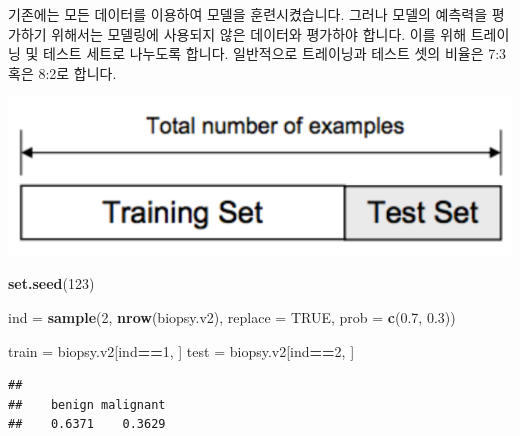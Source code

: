 \documentclass[12pt,]{book}
\newenvironment{Shaded}{\begin{snugshade}}{\end{snugshade}}
\newcommand{\DataTypeTok}[1]{\textcolor[rgb]{0.13,0.29,0.53}{#1}}
\newcommand{\DecValTok}[1]{\textcolor[rgb]{0.00,0.00,0.81}{#1}}
\newcommand{\FloatTok}[1]{\textcolor[rgb]{0.00,0.00,0.81}{#1}}
\newcommand{\KeywordTok}[1]{\textcolor[rgb]{0.13,0.29,0.53}{\textbf{#1}}}
\newcommand{\NormalTok}[1]{#1}
\newcommand{\OperatorTok}[1]{\textcolor[rgb]{0.81,0.36,0.00}{\textbf{#1}}}
\newcommand{\OtherTok}[1]{\textcolor[rgb]{0.56,0.35,0.01}{#1}}
\newcommand{\StringTok}[1]{\textcolor[rgb]{0.31,0.60,0.02}{#1}}
\begin{document}
기존에는 모든 데이터를 이용하여 모델을 훈련시켰습니다. 그러나 모델의 예측력을 평가하기 위해서는 모델링에 사용되지 않은 데이터와 평가하야 합니다. 이를 위해 트레이닝 및 테스트 세트로 나누도록 합니다. 일반적으로 트레이닝과 테스트 셋의 비율은 7:3 혹은 8:2로 합니다.

\begin{center}\includegraphics[width=0.5\linewidth]{images/data_split} \end{center}

\begin{Shaded}
\begin{Highlighting}[]
\KeywordTok{set.seed}\NormalTok{(}\DecValTok{123}\NormalTok{)}

\NormalTok{ind =}\StringTok{ }\KeywordTok{sample}\NormalTok{(}\DecValTok{2}\NormalTok{, }\KeywordTok{nrow}\NormalTok{(biopsy.v2), }\DataTypeTok{replace =} \OtherTok{TRUE}\NormalTok{,}
             \DataTypeTok{prob =} \KeywordTok{c}\NormalTok{(}\FloatTok{0.7}\NormalTok{, }\FloatTok{0.3}\NormalTok{))}

\NormalTok{train =}\StringTok{ }\NormalTok{biopsy.v2[ind}\OperatorTok{==}\DecValTok{1}\NormalTok{, ]}
\NormalTok{test =}\StringTok{ }\NormalTok{biopsy.v2[ind}\OperatorTok{==}\DecValTok{2}\NormalTok{, ]}
\end{Highlighting}
\end{Shaded}

\begin{Shaded}
\end{Shaded}

\begin{verbatim}
## 
##    benign malignant 
##    0.6371    0.3629
\end{verbatim}

\begin{Shaded}
\end{Shaded}
\end{document}
